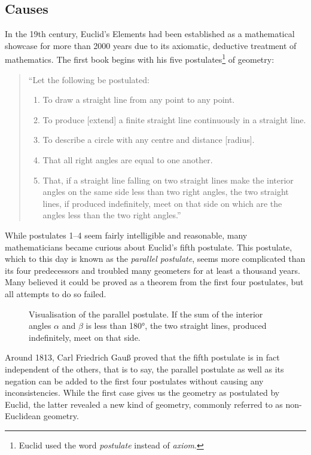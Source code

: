 \documentclass{article}
\begin{document}
\subsection{Causes}\label{ssec_causes}
In the 19th century, Euclid's Elements had been established as a mathematical showcase for more than 2000 years due to its axiomatic, deductive treatment of mathematics. The first book begins with his five postulates\footnote{Euclid used the word \textit{postulate} instead of \textit{axiom}.} of geometry:
\begin{quote}
``Let the following be postulated:
\begin{enumerate}
\item To draw a straight line from any point to any point.
\item To produce [extend] a finite straight line continuously in a straight line.
\item To describe a circle with any centre and distance [radius].
\item That all right angles are equal to one another.
\item That, if a straight line falling on two straight lines make the interior angles on the same side less than two right angles, the two straight lines, if produced indefinitely, meet on that side on which are the angles less than the two right angles.''
\end{enumerate}
\end{quote}
While postulates 1--4 seem fairly intelligible and reasonable, many mathematicians became curious about Euclid's fifth postulate. This postulate, which to this day is known as the \textit{parallel postulate}, seems more complicated than its four predecessors and troubled many geometers for at least a thousand years. Many believed it could be proved as a theorem from the first four postulates, but all attempts to do so failed. 

\begin{figure}[h]
	\centering
{}
	\caption{Visualisation of the parallel postulate. If the sum of the interior angles $\alpha$ and $\beta$ is less than 180°, the two straight lines, produced indefinitely, meet on that side.}
\end{figure}
Around 1813, Carl Friedrich Gauß proved that the fifth postulate is in fact independent of the others, that is to say, the parallel postulate as well as its negation can be added to the first four postulates without causing any inconsistencies. While the first case gives us the geometry as postulated by Euclid, the latter revealed a new kind of geometry, commonly referred to as non-Euclidean geometry.
\end{document}

